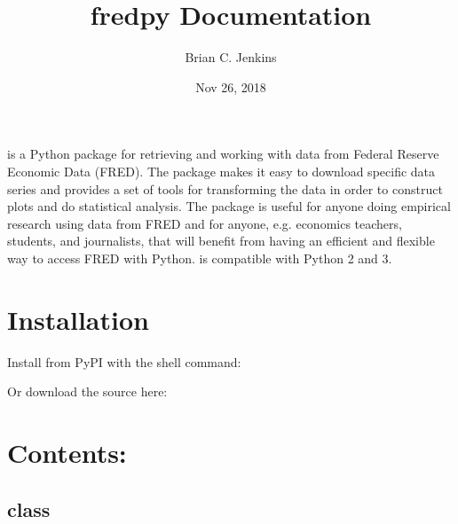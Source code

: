 \documentclass[letterpaper,10pt,openany,oneside,english]{sphinxmanual}
\title{fredpy Documentation}
\date{Nov 26, 2018}
\author{Brian C. Jenkins}
\begin{document}
\pagestyle{empty}
\maketitle
\pagestyle{plain}
\sphinxtableofcontents
\pagestyle{normal}
\label{\detokenize{index::doc}}


 is a Python package for retrieving and working with data from Federal Reserve Economic Data (FRED). The package makes it easy to download specific data series and provides a set of tools for transforming the data in order to construct plots and do statistical analysis. The  package is useful for anyone doing empirical research using data from FRED and for anyone, e.g. economics teachers, students, and journalists, that will benefit from having an efficient and flexible way to access FRED with Python.  is compatible with Python 2 and 3.


\chapter{Installation}
\label{\detokenize{index:installation}}
Install  from PyPI with the shell command:

%
\begin{sphinxVerbatim}[commandchars=\\\{\}]
  
\end{sphinxVerbatim}

Or download the source here: 


\chapter{Contents:}
\label{\detokenize{index:contents}}

\section{ class}
\label{\detokenize{series_class:fredpy-series-class}}\label{\detokenize{series_class::doc}}
\end{document}
